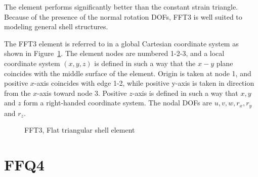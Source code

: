 The element performs significantly better than the constant strain triangle.
Because of the presence of the normal rotation DOFs, FFT3 is well
suited to modeling general shell structures.

The FFT3 element is referred to in a global Cartesian coordinate system
as shown in Figure~\ref{fig:FFT3}.
The element nodes are numbered 1-2-3, and a local coordinate system $(x,y,z)$
is defined in such a way that the $x-y$ plane coincides with the middle surface
of the element.
Origin is taken at node 1, and positive $x$-axis coincides with edge 1-2,
while positive y-axis is taken in direction from the $x$-axis toward node 3.
Positive $z$-axis is defined in such a way that $x,y$ and $z$ form a
right-handed coordinate system.
The nodal DOFs are $u,v,w,r_x,r_y$ and $r_z$.

\begin{figure}[b]
\caption{FFT3, Flat triangular shell element}
\label{fig:FFT3}
\end{figure}

\section{FFQ4}
\label{s:FFQ4}

